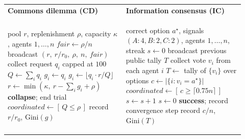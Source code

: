 \documentclass[runningheads]{llncs}
\begin{document}
\begin{algorithm}[t]
\caption{Per-step environment update for both tasks. \emph{Left (CD):} full grants when affordable, else integer-floored proportional; pool reduced by grants, replenished, capped; collapse checked after; Gini over \emph{granted} allocations. \emph{Right (IC):} agents vote after seeing the previous public tally; a step is coordinated when $\geq\lceil 0.75n\rceil$ vote correctly, success requires a five-step streak.}
\label{alg:env}
\small
\setlength{\tabcolsep}{8pt}
\begin{tabular}{@{}p{0.46\linewidth}|p{0.46\linewidth}@{}}
\centering\textbf{\footnotesize Commons dilemma (CD)}
&
\centering\textbf{\footnotesize Information consensus (IC)}
\tabularnewline[2pt]
\begin{minipage}[t]{\linewidth}
\begin{algorithmic}[1]
\Require pool $r$, replenishment $\rho$, capacity $\kappa$, agents $1,\dots,n$
\State $\textit{fair} \gets \rho / n$ \Comment{$=6.25$}
\State broadcast $(r,\ r/r_0,\ \rho,\ n,\ \textit{fair})$
\State collect request $q_i$ capped at $100$
\State $Q \gets \sum_i q_i$ \Comment{total demand}
\If{$Q \le r$}
\State $g_i \gets q_i$ \Comment{full grant}
\Else
\State $g_i \gets \lfloor q_i \cdot r / Q \rfloor$ \Comment{rationing}
\EndIf
\State $r \gets \min(\kappa,\ r - \sum_i g_i + \rho)$
\If{$r \le 0$}
\State \textbf{collapse}; end trial
\EndIf
\State $\textit{coordinated} \gets [\,Q \le \rho\,]$
\State record $r/r_0$, $\mathrm{Gini}(g)$
\end{algorithmic}
\end{minipage}
&
\begin{minipage}[t]{\linewidth}
\begin{algorithmic}[1]
\Require correct option $a^\star$, signals $(A{:}4,B{:}2,C{:}2)$, agents $1,\dots,n$, streak $s \gets 0$
\State broadcast previous public tally $T$
\State collect vote $v_i$ from each agent $i$
\State $T \gets$ tally of $\{v_i\}$ over options
\State $c \gets |\{i : v_i = a^\star\}|$ \Comment{\# correct}
\State $\textit{coordinated} \gets [\,c \ge \lceil 0.75n\rceil\,]$
\If{\textit{coordinated}}
\State $s \gets s+1$
\Else
\State $s \gets 0$
\EndIf
\If{$s \ge 5$}
\State \textbf{success}; record convergence step
\EndIf
\State record $c/n$, $\mathrm{Gini}(T)$
\end{algorithmic}
\end{minipage}
\end{tabular}
\end{algorithm}
\end{document}
